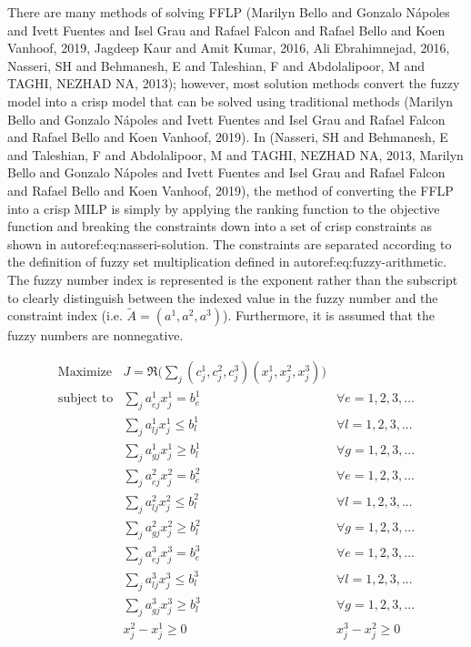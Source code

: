 \documentclass[11pt,a4paper,final]{article}
\begin{document}
There are many methods of solving FFLP
(Marilyn Bello and Gonzalo N{\'a}poles and Ivett Fuentes and Isel Grau and Rafael Falcon and Rafael Bello and Koen Vanhoof, 2019, Jagdeep Kaur and Amit Kumar, 2016, Ali Ebrahimnejad, 2016, Nasseri, SH and Behmanesh, E and Taleshian, F and Abdolalipoor, M and TAGHI, NEZHAD NA, 2013); however, most
solution methods convert the fuzzy model into a crisp model that can be solved using traditional methods
(Marilyn Bello and Gonzalo N{\'a}poles and Ivett Fuentes and Isel Grau and Rafael Falcon and Rafael Bello and Koen Vanhoof, 2019). In (Nasseri, SH and Behmanesh, E and Taleshian, F and Abdolalipoor, M and TAGHI, NEZHAD NA, 2013, Marilyn Bello and Gonzalo N{\'a}poles and Ivett Fuentes and Isel Grau and Rafael Falcon and Rafael Bello and Koen Vanhoof, 2019), the method of converting the FFLP
into a crisp MILP is simply by applying the ranking function to the objective function and breaking the constraints down
into a set of crisp constraints as shown in autoref:eq:nasseri-solution. The constraints are separated according to the
definition of fuzzy set multiplication defined in autoref:eq:fuzzy-arithmetic. The fuzzy number index is represented is
the exponent rather than the subscript to clearly distinguish between the indexed value in the fuzzy number and the
constraint index (i.e. \(\tilde{A} = (a^1,a^2,a^3)\)). Furthermore, it is assumed that the fuzzy numbers are nonnegative.

\begin{equation}
\label{eq:nasseri-solution}
\begin{array}{lll}
\text{Maximize}   & J = \mathfrak{R}\Big(\sum_j (c_j^1,c_j^2,c_j^3)(x_j^1,x_j^2,x_j^3)\Big) &\\
\text{subject to} & \sum_j a_{ej}^1 x_j^1 = b_e^1 &  \forall e = 1,2,3,... \\
                  & \sum_j a_{lj}^1 x_j^1 \le b_l^1 &  \forall l = 1,2,3,... \\
                  & \sum_j a_{gj}^1 x_j^1 \ge b_l^1  &  \forall g = 1,2,3,... \\
                  & \sum_j a_{ej}^2 x_j^2 = b_e^2 &  \forall e = 1,2,3,... \\
                  & \sum_j a_{lj}^2 x_j^2 \le b_l^2 &  \forall l = 1,2,3,... \\
                  & \sum_j a_{gj}^2 x_j^2 \ge b_l^2  &  \forall g = 1,2,3,... \\
                  & \sum_j a_{ej}^3 x_j^3 = b_e^3 &  \forall e = 1,2,3,... \\
                  & \sum_j a_{lj}^3 x_j^3 \le b_l^3 &  \forall l = 1,2,3,... \\
                  & \sum_j a_{gj}^3 x_j^3 \ge b_l^3  &  \forall g = 1,2,3,... \\
                  & x_j^2 - x_j^1 \ge 0         & x_j^3 - x_j^2 \ge 0 \\
\end{array}
\end{equation}
\end{document}
